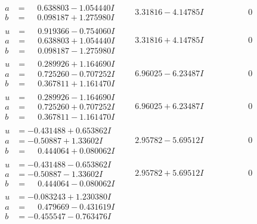 \documentclass[1p]{elsarticle_modified}
\theoremstyle{definition}
\begin{document}
$$\begin{array}{c|c|c}
\begin{aligned}
a &= \phantom{-}0.638803 - 1.054440 I \\
b &= \phantom{-}0.098187 + 1.275980 I\end{aligned}
 & \phantom{-}3.31816 - 4.14785 I & \phantom{-0.000000 } 0 \\ \hline\begin{aligned}
u &= \phantom{-}0.919366 - 0.754060 I \\
a &= \phantom{-}0.638803 + 1.054440 I \\
b &= \phantom{-}0.098187 - 1.275980 I\end{aligned}
 & \phantom{-}3.31816 + 4.14785 I & \phantom{-0.000000 } 0 \\ \hline\begin{aligned}
u &= \phantom{-}0.289926 + 1.164690 I \\
a &= \phantom{-}0.725260 - 0.707252 I \\
b &= \phantom{-}0.367811 + 1.161470 I\end{aligned}
 & \phantom{-}6.96025 - 6.23487 I & \phantom{-0.000000 } 0 \\ \hline\begin{aligned}
u &= \phantom{-}0.289926 - 1.164690 I \\
a &= \phantom{-}0.725260 + 0.707252 I \\
b &= \phantom{-}0.367811 - 1.161470 I\end{aligned}
 & \phantom{-}6.96025 + 6.23487 I & \phantom{-0.000000 } 0 \\ \hline\begin{aligned}
u &= -0.431488 + 0.653862 I \\
a &= -0.50887 + 1.33602 I \\
b &= \phantom{-}0.444064 + 0.080062 I\end{aligned}
 & \phantom{-}2.95782 - 5.69512 I & \phantom{-0.000000 } 0 \\ \hline\begin{aligned}
u &= -0.431488 - 0.653862 I \\
a &= -0.50887 - 1.33602 I \\
b &= \phantom{-}0.444064 - 0.080062 I\end{aligned}
 & \phantom{-}2.95782 + 5.69512 I & \phantom{-0.000000 } 0 \\ \hline\begin{aligned}
u &= -0.083243 + 1.230380 I \\
a &= \phantom{-}0.479669 - 0.431619 I \\
b &= -0.455547 - 0.763476 I\end{aligned}

\end{array}$$
\end{document}

